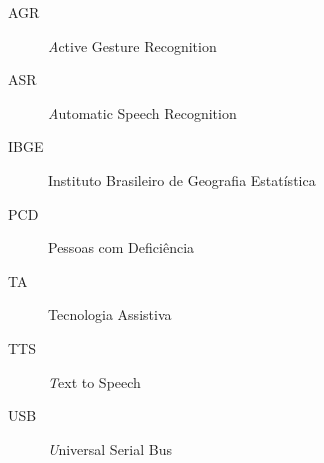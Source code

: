 \begin{description}
	\item[AGR]   \emph Active Gesture Recognition
	\item[ASR]   \emph Automatic Speech Recognition
	\item[IBGE]  Instituto Brasileiro de Geografia Estat\'istica
	\item[PCD]   Pessoas com Deficiência
	\item[TA]    Tecnologia Assistiva
	\item[TTS]   \emph Text to Speech
	\item[USB]   \emph Universal Serial Bus 
\end{description}
